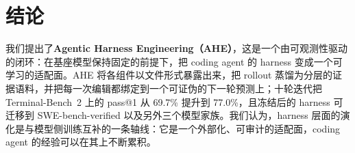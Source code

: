 \section{结论}

我们提出了\textbf{Agentic Harness Engineering（AHE）}，这是一个由可观测性驱动的闭环：在基座模型保持固定的前提下，把 coding agent 的 harness 变成一个可学习的适配面。AHE 将各组件以文件形式暴露出来，把 rollout 蒸馏为分层的证据语料，并把每一次编辑都绑定到一个可证伪的下一轮预测上；十轮迭代把 Terminal-Bench~2 上的 pass@1 从 69.7\% 提升到 77.0\%，且冻结后的 harness 可迁移到 SWE-bench-verified 以及另外三个模型家族。我们认为，harness 层面的演化是与模型侧训练互补的一条轴线：它是一个外部化、可审计的适配面，coding agent 的经验可以在其上不断累积。

